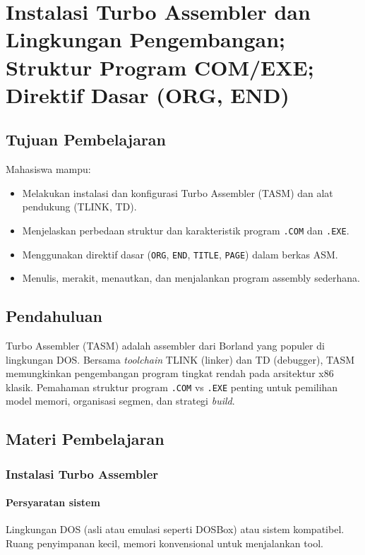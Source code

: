\chapter{Instalasi Turbo Assembler dan Lingkungan Pengembangan; Struktur Program COM/EXE; Direktif Dasar (ORG, END)}

\section{Tujuan Pembelajaran}
Mahasiswa mampu:
\begin{itemize}
  \item Melakukan instalasi dan konfigurasi Turbo Assembler (TASM) dan alat pendukung (TLINK, TD).
  \item Menjelaskan perbedaan struktur dan karakteristik program \texttt{.COM} dan \texttt{.EXE}.
  \item Menggunakan direktif dasar (\texttt{ORG}, \texttt{END}, \texttt{TITLE}, \texttt{PAGE}) dalam berkas ASM.
  \item Menulis, merakit, menautkan, dan menjalankan program assembly sederhana.
\end{itemize}

\section{Pendahuluan}
Turbo Assembler (TASM) adalah assembler dari Borland yang populer di lingkungan DOS. Bersama \textit{toolchain} TLINK (linker) dan TD (debugger), TASM memungkinkan pengembangan program tingkat rendah pada arsitektur x86 klasik. Pemahaman struktur program \texttt{.COM} vs \texttt{.EXE} penting untuk pemilihan model memori, organisasi segmen, dan strategi \textit{build}.

\section{Materi Pembelajaran}
\subsection{Instalasi Turbo Assembler}
\subsubsection{Persyaratan sistem}
Lingkungan DOS (asli atau emulasi seperti DOSBox) atau sistem kompatibel. Ruang penyimpanan kecil, memori konvensional untuk menjalankan tool.

